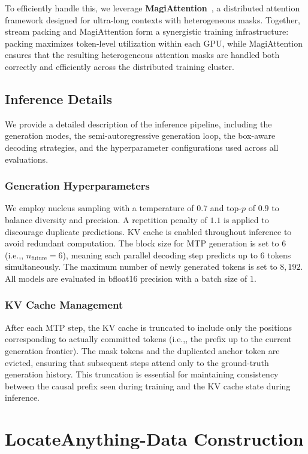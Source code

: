 \documentclass{llmxive}
\providecommand{\ie}{i.e.,\xspace}
\begin{document}
To efficiently handle this, we leverage \textbf{MagiAttention}~\citep{magiattention2025}, a distributed attention framework designed for ultra-long contexts with heterogeneous masks. Together, stream packing and MagiAttention form a synergistic training infrastructure: packing maximizes token-level utilization within each GPU, while MagiAttention ensures that the resulting heterogeneous attention masks are handled both correctly and efficiently across the distributed training cluster.


\subsection{Inference Details}
We provide a detailed description of the inference pipeline, including the generation modes, the semi-autoregressive generation loop, the box-aware decoding strategies, and the hyperparameter configurations used across all evaluations.

\subsubsection{Generation Hyperparameters}
We employ nucleus sampling with a temperature of $0.7$ and top-$p$ of $0.9$ to balance diversity and precision. A repetition penalty of $1.1$ is applied to discourage duplicate predictions. KV cache is enabled throughout inference to avoid redundant computation. The block size for MTP generation is set to $6$ (\ie, $n_{\text{future}} = 6$), meaning each parallel decoding step predicts up to $6$ tokens simultaneously. The maximum number of newly generated tokens is set to $8{,}192$. All models are evaluated in bfloat16 precision with a batch size of $1$.


\subsubsection{KV Cache Management} 
After each MTP step, the KV cache is truncated to include only the positions corresponding to actually committed tokens (\ie, the prefix up to the current generation frontier). The mask tokens and the duplicated anchor token are evicted, ensuring that subsequent steps attend only to the ground-truth generation history. This truncation is essential for maintaining consistency between the causal prefix seen during training and the KV cache state during inference.


\section{LocateAnything-Data Construction}
\end{document}
